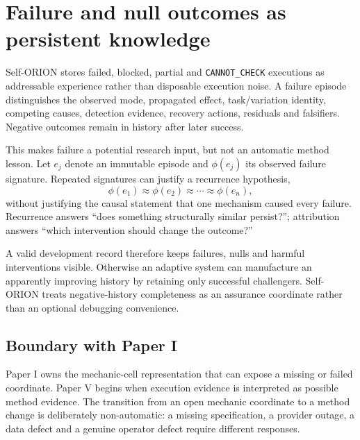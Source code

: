 \section{Failure and null outcomes as persistent knowledge}

Self-ORION stores failed, blocked, partial and \texttt{CANNOT\_CHECK} executions as addressable experience rather than disposable execution noise. A failure episode distinguishes the observed mode, propagated effect, task/variation identity, competing causes, detection evidence, recovery actions, residuals and falsifiers. Negative outcomes remain in history after later success.

This makes failure a potential research input, but not an automatic method lesson. Let $e_j$ denote an immutable episode and $\phi(e_j)$ its observed failure signature. Repeated signatures can justify a recurrence hypothesis,
\[
\phi(e_1)\approx\phi(e_2)\approx\cdots\approx\phi(e_n),
\]
without justifying the causal statement that one mechanism caused every failure. Recurrence answers ``does something structurally similar persist?''; attribution answers ``which intervention should change the outcome?''

A valid development record therefore keeps failures, nulls and harmful interventions visible. Otherwise an adaptive system can manufacture an apparently improving history by retaining only successful challengers. Self-ORION treats negative-history completeness as an assurance coordinate rather than an optional debugging convenience.

\subsection{Boundary with Paper I}

Paper I owns the mechanic-cell representation that can expose a missing or failed coordinate. Paper V begins when execution evidence is interpreted as possible method evidence. The transition from an open mechanic coordinate to a method change is deliberately non-automatic: a missing specification, a provider outage, a data defect and a genuine operator defect require different responses.
